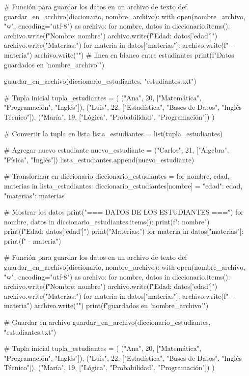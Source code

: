 # Función para guardar los datos en un archivo de texto
def guardar_en_archivo(diccionario, nombre_archivo):
    with open(nombre_archivo, "w", encoding="utf-8") as archivo:
        for nombre, datos in diccionario.items():
            archivo.write(f"Nombre: {nombre}\n")
            archivo.write(f"Edad: {datos['edad']}\n")
            archivo.write("Materias:\n")
            for materia in datos["materias"]:
                archivo.write(f" - {materia}\n")
            archivo.write("\n")  # línea en blanco entre estudiantes
    print(f"Datos guardados en '{nombre_archivo}'")

    guardar_en_archivo(diccionario_estudiantes, "estudiantes.txt")

    # Tupla inicial
tupla_estudiantes = (
    ("Ana", 20, ["Matemática", "Programación", "Inglés"]),
    ("Luis", 22, ["Estadística", "Bases de Datos", "Inglés Técnico"]),
    ("María", 19, ["Lógica", "Probabilidad", "Programación"])
)

# Convertir la tupla en lista
lista_estudiantes = list(tupla_estudiantes)

# Agregar nuevo estudiante
nuevo_estudiante = ("Carlos", 21, ["Álgebra", "Física", "Inglés"])
lista_estudiantes.append(nuevo_estudiante)

# Transformar en diccionario
diccionario_estudiantes = {}
for nombre, edad, materias in lista_estudiantes:
    diccionario_estudiantes[nombre] = {
        "edad": edad,
        "materias": materias
    }

# Mostrar los datos
print("=== DATOS DE LOS ESTUDIANTES ===")
for nombre, datos in diccionario_estudiantes.items():
    print(f"\nNombre: {nombre}")
    print(f"Edad: {datos['edad']}")
    print("Materias:")
    for materia in datos["materias"]:
        print(f" - {materia}")

# Función para guardar los datos en un archivo de texto
def guardar_en_archivo(diccionario, nombre_archivo):
    with open(nombre_archivo, "w", encoding="utf-8") as archivo:
        for nombre, datos in diccionario.items():
            archivo.write(f"Nombre: {nombre}\n")
            archivo.write(f"Edad: {datos['edad']}\n")
            archivo.write("Materias:\n")
            for materia in datos["materias"]:
                archivo.write(f" - {materia}\n")
            archivo.write("\n")
    print(f"\nDatos guardados en '{nombre_archivo}'")

# Guardar en archivo
guardar_en_archivo(diccionario_estudiantes, "estudiantes.txt")

# Tupla inicial
tupla_estudiantes = (
    ("Ana", 20, ["Matemática", "Programación", "Inglés"]),
    ("Luis", 22, ["Estadística", "Bases de Datos", "Inglés Técnico"]),
    ("María", 19, ["Lógica", "Probabilidad", "Programación"])
)

